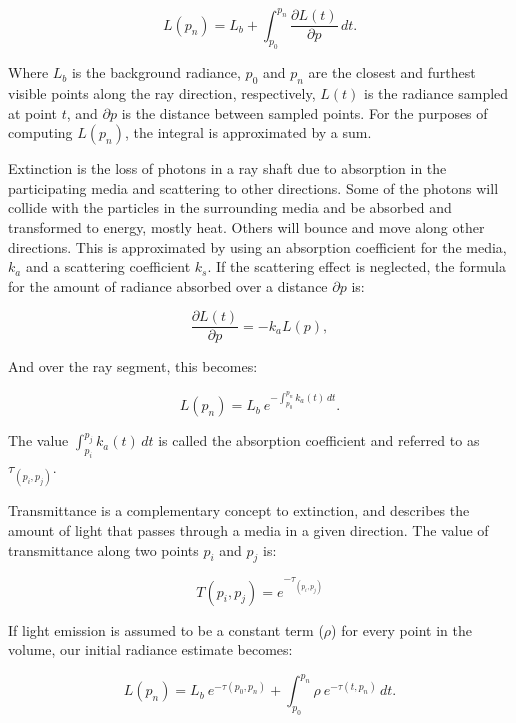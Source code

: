 \documentclass[oneside,a4paper,english,links]{amca}
\begin{document}
\begin{equation} \label{eq:general_radiance}  
  L(p_n) = L_b + \int_{p_0}^{p_n} \frac{\partial L(t)}{\partial p} \, dt.
\end{equation}

Where $L_b$ is the background radiance, $p_0$ and $p_n$ are the
closest and furthest visible points along the ray direction,
respectively, $L(t)$ is the radiance sampled at point $t$, and
$\partial p$ is the distance between sampled points. For the purposes
of computing $L(p_n)$, the integral is approximated by a sum.

Extinction is the loss of photons in a ray shaft due to absorption in
the participating media and scattering to other directions. Some of
the photons will collide with the particles in the
surrounding media and be absorbed and transformed to energy, mostly
heat. Others will bounce and move along other directions. This is
approximated by using an absorption coefficient for the media, $k_a$
and a scattering coefficient $k_s$. If the scattering effect is
neglected, the formula for the amount of radiance absorbed over a
distance $\partial p$ is:

\begin{equation} \label{eq:radiance_absorption_defferential}  
    \frac{\partial L(t)}{\partial p} = -k_a L(p),
\end{equation}

And over the ray segment, this becomes: 

\begin{equation} \label{eq:radiance_absorption}  
    L(p_n) = L_b \ e^{-\int_{p_0}^{p_n} k_a(t) \, dt}.
\end{equation}

The value $\int_{p_i}^{p_j} k_a(t) \, dt$ is called the
absorption coefficient and referred to as $\tau_{(p_i, p_j)}$.

Transmittance is a complementary concept to extinction, and describes
the amount of light that passes through a media in a given
direction. The value of transmittance along two points $p_i$ and $p_j$
is:

\begin{equation} \label{eq:general_radiance}  
  T(p_i,p_j) = e^{-\tau_{(p_i, p_j)}}
\end{equation}

If light emission is assumed to be a constant term ($\rho$) for
every point in the volume, our initial radiance estimate becomes:

\begin{equation} \label{eq:ray_radiance}  
  L(p_n) = L_b \ e^{-\tau(p_0, p_n)} + \int_{p_0}^{p_n} \rho \ e^{-\tau(t,p_n)} \, dt.
\end{equation}
\end{document}
